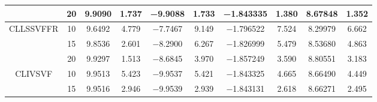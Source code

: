 \documentclass{style/presentation}
\begin{document}
\begin{frame}
\begin{table}[!htbp]
\begin{center}
\begin{tabular}{cccccccccc}
                                                            & \num{20} & \num{9.9090}                        & \num{1.737}                            & \num{-9.9088}                       & \num{1.733}                            & \num{-1.843335}                    & \num{1.380}                            & \num{8.67848}                       & \num{1.352}                            \\
                \hline
                \multirow{3}{*}{CLLSSVFFR}                  & \num{10} & \num{9.6492}                        & \num{4.779}                            & \num{-7.7467}                       & \num{9.149}                            & \num{-1.796522}                    & \num{7.524}                            & \num{8.29979}                       & \num{6.662}                            \\
                                                            & \num{15} & \num{9.8536}                        & \num{2.601}                            & \num{-8.2900}                       & \num{6.267}                            & \num{-1.826999}                    & \num{5.479}                            & \num{8.53680}                       & \num{4.863}                            \\
                                                            & \num{20} & \num{9.9297}                        & \num{1.513}                            & \num{-8.6845}                       & \num{3.970}                            & \num{-1.857249}                    & \num{3.590}                            & \num{8.80551}                       & \num{3.183}                            \\
                \hline
                \multirow{3}{*}{CLIVSVF}                    & \num{10} & \num{9.9513}                        & \num{5.423}                            & \num{-9.9537}                       & \num{5.421}                            & \num{-1.843325}                    & \num{4.665}                            & \num{8.66490}                       & \num{4.449}                            \\
                                                            & \num{15} & \num{9.9516}                        & \num{2.946}                            & \num{-9.9539}                       & \num{2.939}                            & \num{-1.843131}                    & \num{2.618}                            & \num{8.66271}                       & \num{2.495}                            \\

\end{tabular}
\end{center}
\end{table}
\end{frame}
\end{document}
